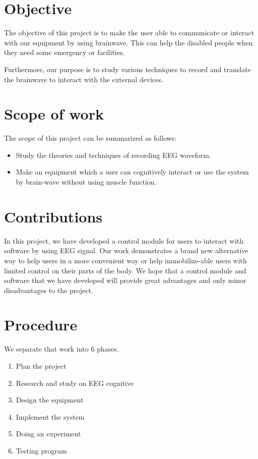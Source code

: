 \section{Objective}
\hspace{1.5cm} The objective of this project is to make the user able to communicate or interact with our equipment by using brainwave. This can help the disabled people when they need some emergency or facilities. \par
Furthermore, our purpose is to study various techniques to record and translate the brainwave to interact with the external devices. 

\section{Scope of work}

The scope of this project can be summarized as follows:
\begin{itemize}
\vspace{-1cm}
	\item Study the theories and techniques of recording EEG waveform.
\vspace{-1cm}
    \item Make an equipment which a user can cognitively interact or use the system by brain-wave without using muscle function.
\end{itemize}  

\section{Contributions}
\hspace{1.5cm} In this project, we have developed a control module for users to interact with software by using EEG signal. Our work demonstrates a brand new alternative way to help users in a more convenient way or help immobilize-able users with limited control on their parts of the body. We hope that a control module and software that we have developed will provide great advantages and only minor disadvantages to the project.

\section{Procedure}
We separate that work into 6 phases. 
\begin{enumerate}
\vspace{-0.5cm}
\item Plan the project 
\vspace{-0.25cm}
\item Research and study on EEG cognitive 
\vspace{-0.25cm}
\item Design the equipment 
\vspace{-0.25cm}
\item Implement the system 
\vspace{-0.25cm}
\item Doing an experiment 
\vspace{-0.25cm}
\item Testing program
\end{enumerate}

